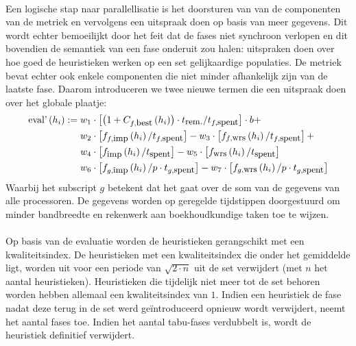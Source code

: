 \paragraph{}
Een logische stap naar parallellisatie is het doorsturen van van de componenten van de metriek en vervolgens een uitspraak doen op basis van meer gegevens. Dit wordt echter bemoeilijkt door het feit dat de fases niet synchroon verlopen en dit bovendien de semantiek van een fase onderuit zou halen: uitspraken doen over hoe goed de heuristieken werken op een set gelijkaardige populaties. De metriek bevat echter ook enkele componenten die niet minder afhankelijk zijn van de laatste fase. Daarom introduceren we twee nieuwe termen die een uitspraak doen over het globale plaatje:
\begin{align*}
\mbox{eval'}\left(h_i\right):={}&w_1\cdot\left[\left(1+C_{f,\mbox{\small{best}}}\left(h_i\right)\right)\cdot t_{\mbox{\small{rem.}}}/t_{f,\mbox{\small{spent}}}\right]\cdot b+\\
&w_2\cdot\left[f_{f,\mbox{\small{imp}}}\left(h_i\right)/t_{f,\mbox{\small{spent}}}\right]-w_3\cdot\left[f_{f,\mbox{\small{wrs}}}\left(h_i\right)/t_{f,\mbox{\small{spent}}}\right]+\\
&w_4\cdot\left[f_{\mbox{\small{imp}}}\left(h_i\right)/t_{\mbox{\small{spent}}}\right]-w_5\cdot\left[f_{\mbox{\small{wrs}}}\left(h_i\right)/t_{\mbox{\small{spent}}}\right]\\
&w_6\cdot\left[f_{g,\mbox{\small{imp}}}\left(h_i\right)/p\cdot t_{g,\mbox{\small{spent}}}\right]-w_7\cdot\left[f_{g,\mbox{\small{wrs}}}\left(h_i\right)/p\cdot t_{g,\mbox{\small{spent}}}\right]
\end{align*}
Waarbij het subscript $g$ betekent dat het gaat over de som van de gegevens van alle processoren. De gegevens worden op geregelde tijdstippen doorgestuurd om minder bandbreedte en rekenwerk aan boekhoudkundige taken toe te wijzen.

\paragraph{}
Op basis van de evaluatie worden de heuristieken gerangschikt met een kwaliteitsindex. De heuristieken met een kwaliteitsindex die onder het gemiddelde ligt, worden uit voor een periode van $\sqrt{2\cdot n}$ uit de set verwijdert (met $n$ het aantal heuristieken). Heuristieken die tijdelijk niet meer tot de set behoren worden hebben allemaal een kwaliteitsindex van $1$. Indien een heuristiek de fase nadat deze terug in de set werd ge\"introduceerd opnieuw wordt verwijdert, neemt het aantal fases toe. Indien het aantal tabu-fases verdubbelt is, wordt de heuristiek definitief verwijdert.

\paragraph{}


